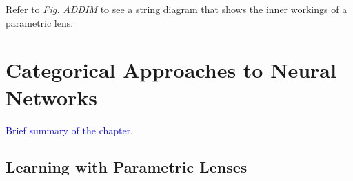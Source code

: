 \documentclass[12pt,a4paper,openright,twoside]{report}
\theoremstyle{plain}
\theoremstyle{definition}
\begin{document}
  Refer to \textit{Fig. ADDIM} to see a string diagram that shows the inner workings of a parametric lens.












\chapter{Categorical Approaches to Neural Networks}
\lhead[\fancyplain{}{\bfseries\thepage}]{\fancyplain{}{\bfseries\rightmark}}




\textcolor{blue}{Brief summary of the chapter.}





\section{Learning with Parametric Lenses}
\end{document}
